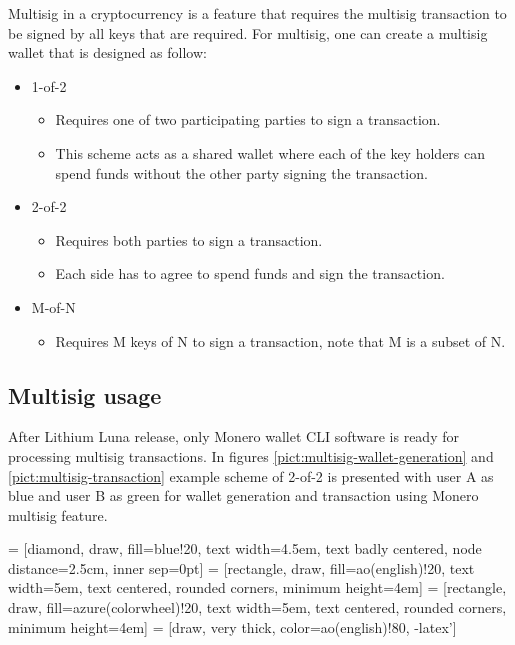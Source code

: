 \documentclass[
  printed, %
  table,   %
  nolof,     %
  nolot,     %
           oneside, color
]{fithesis3}
\begin{document}
Multisig in a cryptocurrency is a feature that requires the multisig transaction to be signed by all keys that are required. For multisig, one can create a multisig wallet that is designed as follow:
\begin{itemize}\itemsep0em
\item 1-of-2 
\begin{itemize}\itemsep0em \item Requires one of two participating parties to sign a transaction. \item This scheme acts as a shared wallet where each of the key holders can spend funds without the other party signing the transaction. \end{itemize}
\item 2-of-2 \begin{itemize}\itemsep0em \item  Requires both parties to sign a transaction. \item Each side has to agree to spend funds and sign the transaction.\end{itemize}
\item M-of-N \begin{itemize}\itemsep0em \item  Requires M keys of N to sign a transaction, note that M is a subset of N. \end{itemize}
\end{itemize}

\subsection{Multisig usage}
After Lithium Luna release, only Monero wallet CLI software is ready for processing multisig transactions. In figures \ref{pict:multisig-wallet-generation} and \ref{pict:multisig-transaction} example scheme of 2-of-2 is presented with user A as blue and user B as green for wallet generation and transaction using Monero multisig feature. 


\newpage
{}
 = [diamond, draw, fill=blue!20,
    text width=4.5em, text badly centered, node distance=2.5cm, inner sep=0pt]
 = [rectangle, draw, fill=ao(english)!20,
    text width=5em, text centered, rounded corners, minimum height=4em]
 = [rectangle, draw, fill=azure(colorwheel)!20,
    text width=5em, text centered, rounded corners, minimum height=4em]
 = [draw, very thick, color=ao(english)!80, -latex']
\end{document}
